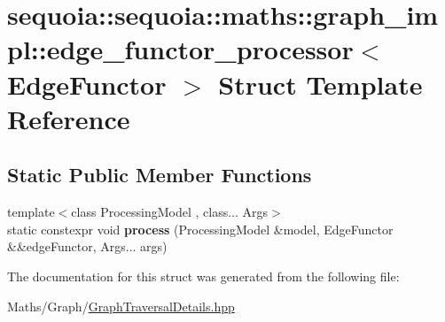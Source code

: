 \hypertarget{structsequoia_1_1sequoia_1_1maths_1_1graph__impl_1_1edge__functor__processor}{}\section{sequoia\+::sequoia\+::maths\+::graph\+\_\+impl\+::edge\+\_\+functor\+\_\+processor$<$ Edge\+Functor $>$ Struct Template Reference}
\label{structsequoia_1_1sequoia_1_1maths_1_1graph__impl_1_1edge__functor__processor}
\subsection*{Static Public Member Functions}
\begin{DoxyCompactItemize}
\item 
\mbox{\label{structsequoia_1_1sequoia_1_1maths_1_1graph__impl_1_1edge__functor__processor_ad16a98d029ad49c6e6eeb2615c9ccd74}} 
{\footnotesize template$<$class Processing\+Model , class... Args$>$ }\\static constexpr void {\bfseries process} (Processing\+Model \&model, Edge\+Functor \&\&edge\+Functor, Args... args)
\end{DoxyCompactItemize}


The documentation for this struct was generated from the following file\+:\begin{DoxyCompactItemize}
\item 
Maths/\+Graph/\mbox{\hyperlink{_graph_traversal_details_8hpp}{Graph\+Traversal\+Details.\+hpp}}\end{DoxyCompactItemize}
